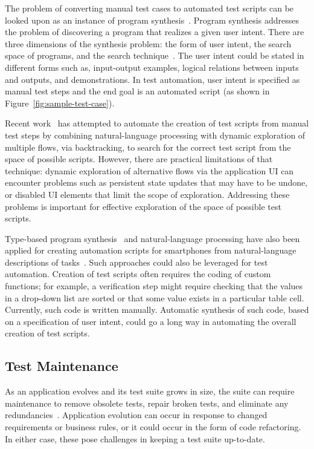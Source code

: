 The problem of converting manual test cases to automated test scripts can be
looked upon as an instance of program synthesis~\cite{Gulwani:2010}.  Program
synthesis addresses the problem of discovering a program that realizes a given
user intent. There are three dimensions of the synthesis problem: the form of
user intent, the search space of programs, and the search
technique~\cite{Gulwani:2010}. The user intent could be stated in different
forms such as, input-output examples, logical relations between inputs and
outputs, and demonstrations. In test automation, user intent is specified as
manual test steps and the end goal is an automated script (\eg as shown in
Figure~\ref{fig:sample-test-case}).

Recent work~\cite{thummalapenta:2012a} has attempted to automate the creation of
test scripts from manual test steps by combining natural-language processing
with dynamic exploration of multiple flows, via backtracking, to search for the
correct test script from the space of possible scripts. However, there are
practical limitations of that technique: dynamic exploration of alternative
flows via the application UI can encounter problems such as persistent state
updates that may have to be undone, or disabled UI elements that limit the scope
of exploration. Addressing these problems is important for effective exploration
of the space of possible test scripts.

Type-based program synthesis~\cite{Perelman:2012} and natural-language
processing have also been applied for creating automation scripts for
smartphones from natural-language descriptions of tasks~\cite{Le:2013}. Such
approaches could also be leveraged for test automation. Creation of test scripts
often requires the coding of custom functions; for example, a verification step
might require checking that the values in a drop-down list are sorted or that
some value exists in a particular table cell. Currently, such code is written
manually. Automatic synthesis of such code, based on a specification of user
intent, could go a long way in automating the overall creation of test scripts.

\subsection{Test Maintenance}
\label{sec:test-maintenance}

As an application evolves and its test suite grows in size, the suite can
require maintenance to remove obsolete tests, repair broken tests, and eliminate
any redundancies~\cite{Pinto:2012}.  Application evolution can occur in response
to changed requirements or business rules, or it could occur in the form of code
refactoring. In either case, these pose challenges in keeping a test suite
up-to-date.

